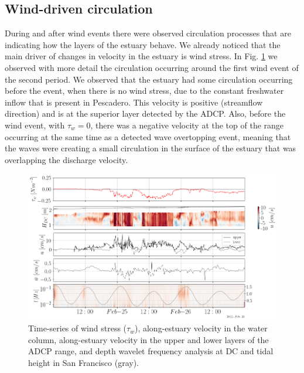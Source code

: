 \documentclass[tesis.tex]{subfiles}
\begin{document}
\subsection{Wind-driven circulation}

During and after wind events there were observed circulation processes that are indicating how the layers of the estuary behave. We already noticed that the main driver of changes in velocity in the estuary is wind stress. In Fig. \ref{fig:velwind} we observed with more detail the circulation occurring around the first wind event of the second period. We observed that the estuary had some circulation occurring before the event, when there is no wind stress, due to the constant freshwater inflow that is present in Pescadero. This velocity is positive (streamflow direction) and is at the superior layer detected by the ADCP. Also, before the wind event, with $\tau_w =0$, there was a negative velocity at the top of the range occurring at the same time as a detected wave overtopping event, meaning that the waves were creating a small circulation in the surface of the estuary that was overlapping the discharge velocity.\\

\begin{figure}[h!]
    \centering
    \includegraphics[width=\textwidth]{Imagenes/vel_wind.png}
    \caption{Time-series of wind stress ($\tau_w$), along-estuary velocity in the water column, along-estuary velocity in the upper and lower layers of the ADCP range, and depth wavelet frequency analysis at DC and tidal height in San Francisco (gray). }
    \label{fig:velwind}
\end{figure}
\end{document}
